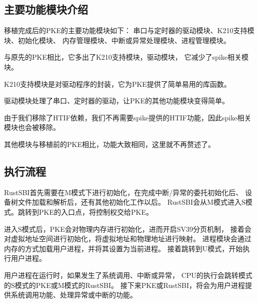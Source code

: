 \subsection{主要功能模块介绍}

移植完成后的PKE的主要功能模块如下：
串口与定时器的驱动模块、K210支持模块、初始化模块、
内存管理模块、中断或异常处理模块、进程管理模块。

与原先的PKE相比，它多出了K210支持模块，驱动模块，
它减少了spike相关模块。

K210支持模块是对驱动程序的封装，它为PKE提供了简单易用的库函数。

驱动模块处理了串口、定时器的驱动，让PKE的其他功能模块变得简单。

由于我们移除了HTIF依赖，我们不再需要spike提供的HTIF功能，因此spike相关模块也会被移除。

其他模块与移植前的PKE相比，功能大致相同，这里就不再赘述了。


\subsection{执行流程}


RustSBI首先需要在M模式下进行初始化，在完成中断/异常的委托初始化后、
设备树文件加载和解析后，还有其他初始化工作以后。
RustSBI会从M模式进入S模式。跳转到PKE的入口点，将控制权交给PKE。

进入S模式后，PKE会对物理内存进行初始化，进而开启SV39分页机制，
接着会对虚拟地址空间进行初始化，将虚拟地址和物理地址进行映射。
进程模块会通过内存的方式加载用户进程，并将其设置为当前进程。
接着跳转到U模式，开始执行用户进程。

用户进程在运行时，如果发生了系统调用、中断或异常，
CPU的执行会跳转模式的S模式的PKE或M模式的RustSBI。
接下来PKE或RustSBI，将会为用户进程提供系统调用功能、处理异常或中断的功能。